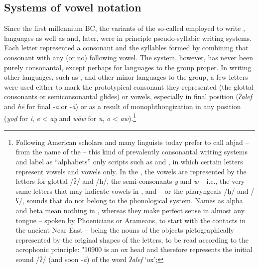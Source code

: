 \documentclass[output=paper,colorlinks,citecolor=brown,arabfont,syriacfont]{langscibook}
\begin{document}
    \subsection{Systems of vowel notation}\label{ch.3.6.ss.1.3}

Since the first millennium BC, the variants of the so-called   employed to write ,  languages as well as  and, later,  were in principle pseudo-syllabic writing systems. Each letter represented a consonant and the syllables formed by combining that consonant with any (or no) following vowel. The system, however, has never been purely consonantal, except perhaps for languages  to the  group proper. In writing other languages, such as ,  and other minor languages  to the  group, a few letters were used either to mark the prototypical consonant they represented (the glottal consonants or semiconsonantal glides) or vowels, especially in final position (\textit{ʔalef} and \textit{hē} for final -\textit{a} or -\textit{ā}) or as a result of monophthongization in any position (\textit{yoḏ} for \textit{i}, \textit{e} < \textit{ay} and \textit{wāw} for \textit{u}, \textit{o} < \textit{aw}).\footnote{%
Following \citet{daniels1990} American scholars and many linguists today prefer to call abjad -- from the  name of the  -- this kind of prevalently consonantal writing systems and label as ``alphabets'' only scripts such as  and , in which certain letters represent vowels and vowels only. In the  , the vowels are represented by the  letters for glottal /ʔ/ and /h/, the semi-consonants \textit{y} and \textit{w} -- i.e., the very same letters that may indicate vowels in ,  and  -- or the pharyngeals /ḥ/ and /ʕ/,  sounds that do not belong to the  phonological system. Names as alpha and beta mean nothing in , whereas they make perfect sense in almost any  tongue -- spoken by Phoenicians or Arameans, to start with the  contacts in the ancient Near East -- being the  nouns of the objects pictographically represented by the original shapes of the letters, to be read according to the acrophonic principle:
{\phoenicianfont\char"10900}
is an ox head and therefore represents the initial sound /ʔ/ (and soon -\textit{ā}) of the word \textit{ʔalef} `ox';
}
\end{document}
